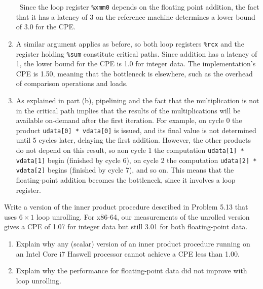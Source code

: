 \documentclass[12pt]{article}
\newenvironment{ex}[2][Exercise]{\begin{trivlist}
		\item[\hskip \labelsep {\bfseries #1}\hskip \labelsep {\bfseries #2.}]}{\end{trivlist}}
\newenvironment{sol}[1][Solution]{\begin{trivlist}
		\item[\hskip \labelsep {\bfseries #1:}]}{\end{trivlist}}
\begin{document}
\begin{sol}
\begin{enumerate}[label=(\alph*)]
		\
		Since the loop register \texttt{\%xmm0} depends on the floating point addition,
		the fact that it has a latency of 3 on the reference machine determines a
		lower bound of 3.0 for the CPE.
		\item A similar argument applies as before, so both loop registers \texttt{\%rcx}
		and the register holding \texttt{\%sum} constitute critical paths. Since addition
		has a latency of 1, the lower bound for the CPE is 1.0 for integer data. The
		implementation's CPE is 1.50, meaning that the bottleneck is elsewhere, such
		as the overhead of comparison operations and loads.
		\item As explained in part (b), pipelining and the fact that the multiplication is not
		in the critical path implies that the results of the multiplications will
		be available on-demand after the first iteration. For example, on cycle 0 the
		product \texttt{udata[0] * vdata[0]} is issued, and its final value is not determined
		until 5 cycles later, delaying the first addition. However, the other products
		do not depend on this result, so aon cycle 1 the computation \texttt{udata[1] * vdata[1]}
		begin (finished by cycle 6), on cycle 2 the computation \texttt{udata[2] * vdata[2]} begins
		(finished by cycle 7), and so on. This means that the floating-point addition
		becomes the bottleneck, since it involves a loop register.
	\end{enumerate}
\end{sol}

\begin{ex}{5.14}
	Write a version of the inner product procedure described in Problem 5.13 that uses
	$6\times 1$ loop unrolling. For x86-64, our measurements of the unrolled version gives
	a CPE of 1.07 for integer data but still 3.01 for both floating-point data.
	\begin{enumerate}[label=(\alph*)]
		\item Explain why any (scalar) version of an inner product procedure running on
		an Intel Core i7 Haswell processor cannot achieve a CPE less than 1.00.
		\item Explain why the performance for floating-point data did not improve with
		loop unrolling.
	\end{enumerate}
\end{ex}
\end{document}
